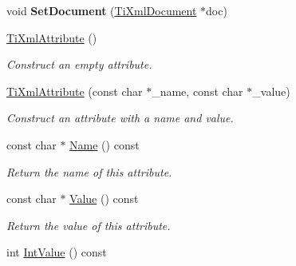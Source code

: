 \begin{DoxyCompactItemize}
\item 
\hypertarget{class_ti_xml_attribute_ac12a94d4548302afb12f488ba101f7d1}{void {\bfseries Set\+Document} (\hyperlink{class_ti_xml_document}{Ti\+Xml\+Document} $\ast$doc)}\label{class_ti_xml_attribute_ac12a94d4548302afb12f488ba101f7d1}

\item 
\hypertarget{class_ti_xml_attribute_a9cfa3c8179873fd485d83003b114f8e1}{\hyperlink{class_ti_xml_attribute_a9cfa3c8179873fd485d83003b114f8e1}{Ti\+Xml\+Attribute} ()}\label{class_ti_xml_attribute_a9cfa3c8179873fd485d83003b114f8e1}

\begin{DoxyCompactList}\small\item\em Construct an empty attribute. \end{DoxyCompactList}\item 
\hypertarget{class_ti_xml_attribute_a759d0b76fb8fcf765ecab243bc14f05e}{\hyperlink{class_ti_xml_attribute_a759d0b76fb8fcf765ecab243bc14f05e}{Ti\+Xml\+Attribute} (const char $\ast$\+\_\+name, const char $\ast$\+\_\+value)}\label{class_ti_xml_attribute_a759d0b76fb8fcf765ecab243bc14f05e}

\begin{DoxyCompactList}\small\item\em Construct an attribute with a name and value. \end{DoxyCompactList}\item 
\hypertarget{class_ti_xml_attribute_a298a57287d305904ba6bd96ae6f78d3d}{const char $\ast$ \hyperlink{class_ti_xml_attribute_a298a57287d305904ba6bd96ae6f78d3d}{Name} () const }\label{class_ti_xml_attribute_a298a57287d305904ba6bd96ae6f78d3d}

\begin{DoxyCompactList}\small\item\em Return the name of this attribute. \end{DoxyCompactList}\item 
\hypertarget{class_ti_xml_attribute_a0f874490eac8ca00ee0070765d0e97e3}{const char $\ast$ \hyperlink{class_ti_xml_attribute_a0f874490eac8ca00ee0070765d0e97e3}{Value} () const }\label{class_ti_xml_attribute_a0f874490eac8ca00ee0070765d0e97e3}

\begin{DoxyCompactList}\small\item\em Return the value of this attribute. \end{DoxyCompactList}\item 
\hypertarget{class_ti_xml_attribute_aa1a20ad59dc7e89a0ab265396360d50f}{int \hyperlink{class_ti_xml_attribute_aa1a20ad59dc7e89a0ab265396360d50f}{Int\+Value} () const }\label{class_ti_xml_attribute_aa1a20ad59dc7e89a0ab265396360d50f}


\end{DoxyCompactItemize}
